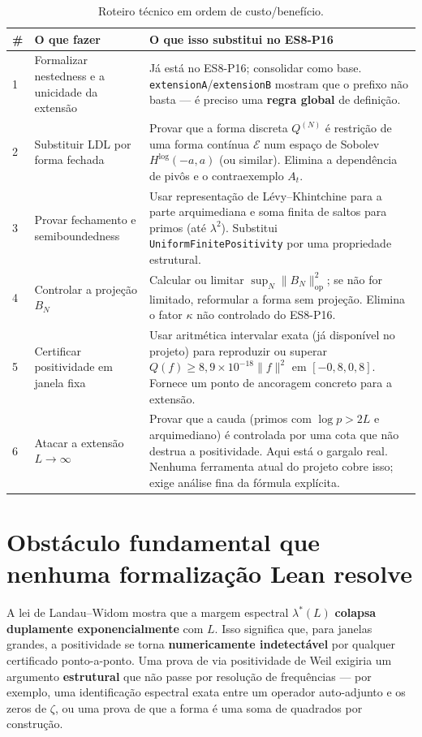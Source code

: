 \documentclass[11pt,a4paper]{article}
\theoremstyle{definition}
\theoremstyle{remark}
\newcommand{\op}{\mathrm{op}}
\newcommand{\E}{\mathcal{E}}
\newcommand{\RH}{\mathrm{RH}}
\begin{document}
\begin{table}[h!]
\centering
\small
\begin{tabular}{p{0.5cm} p{4.5cm} p{7cm}}
\toprule
\# & O que fazer & O que isso substitui no ES8-P16 \\
\midrule
1 & Formalizar nestedness e a unicidade da extensão
  & Já está no ES8-P16; consolidar como base.
    \texttt{extensionA}/\texttt{extensionB} mostram que o prefixo não basta
    --- é preciso uma \textbf{regra global} de definição. \\
2 & Substituir LDL por forma fechada
  & Provar que a forma discreta \(Q^{(N)}\) é restrição de uma forma contínua
    \(\E\) num espaço de Sobolev \(H^{\log}(-a,a)\) (ou similar).
    Elimina a dependência de pivôs e o contraexemplo \(A_t\). \\
3 & Provar fechamento e semiboundedness
  & Usar representação de Lévy--Khintchine para a parte arquimediana e soma
    finita de saltos para primos (até \(\lambda^2\)).
    Substitui \texttt{UniformFinitePositivity} por uma propriedade
    estrutural. \\
4 & Controlar a projeção \(B_N\)
  & Calcular ou limitar \(\sup_N\|B_N\|_{\op}^2\); se não for limitado,
    reformular a forma sem projeção.
    Elimina o fator \(\kappa\) não controlado do ES8-P16. \\
5 & Certificar positividade em janela fixa
  & Usar aritmética intervalar exata (já disponível no projeto) para
    reproduzir ou superar \(Q(f)\ge 8{,}9\times 10^{-18}\|f\|^2\) em
    \([-0{,}8,0{,}8]\). Fornece um ponto de ancoragem concreto para a
    extensão. \\
6 & Atacar a extensão \(L\to\infty\)
  & Provar que a cauda (primos com \(\log p>2L\) e arquimediano) é
    controlada por uma cota que não destrua a positividade. Aqui está o
    gargalo real. Nenhuma ferramenta atual do projeto cobre isso; exige
    análise fina da fórmula explícita. \\
\bottomrule
\end{tabular}
\caption{Roteiro técnico em ordem de custo/benefício.}
\label{tab:roteiro}
\end{table}

\section{Obstáculo fundamental que nenhuma formalização Lean resolve}

A lei de Landau--Widom mostra que a margem espectral \(\lambda^*(L)\)
\textbf{colapsa duplamente exponencialmente} com \(L\). Isso significa que,
para janelas grandes, a positividade se torna \textbf{numericamente
indetectável} por qualquer certificado ponto-a-ponto. Uma prova de \RH{} via
positividade de Weil exigiria um argumento \textbf{estrutural} que não passe
por resolução de frequências --- por exemplo, uma identificação espectral
exata entre um operador auto-adjunto e os zeros de \(\zeta\), ou uma prova de
que a forma é uma soma de quadrados por construção.
\end{document}
